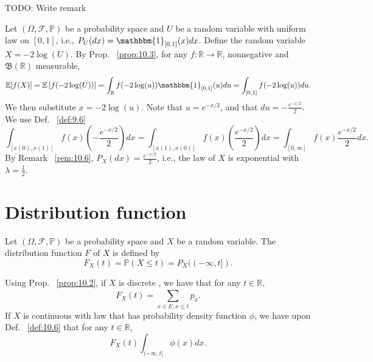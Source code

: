 \begin{remark}[]
    \label{rem:10.6}
    TODO: Write remark
\end{remark}

\begin{example}[]
    \label{ex:10.20}
    Let $(\Omega, \mathcal{F}, \mathbb{P})$ be a probability space and $U $ be a random variable with
    uniform law on $\left[ 0,1 \right]  $, i.e., $P_U(dx) = \mathbbm{1}_{\left[ 0,1 \right] }(x) dx $. 
    Define the random variable $X = -2\log(U) $. By Prop. ~\ref{prop:10.3}, for any $f: \mathbb{R} \to \mathbb{R} $,
    nonnegative and $\mathfrak{B}(\mathbb{R}) $ measurable,
    \[
      \mathbb{E}[f(X)] = \mathbb{E}\left[ f(-2\log(U)) \right] 
      = \int_{\mathbb{R}} f(-2\log(u))\mathbbm{1}_{\left[ 0,1 \right] }(u) du 
      = \int_{\left[ 0,1 \right] } f(-2\log(u))du
    .\] 
    We then substitute $x = -2\log(u)$. Note that $u = e^{-x / 2} $, and that
    $du = - \frac{e^{-x/2}}{2} $. We use Def. ~\ref{def:9.6}
    \[
    \int_{\left[ x(0), x(1) \right] } f(x)\left(-\frac{e^{-x / 2}}{2} \right) dx
    = \int_{\left[ x(1), x(0) \right] } f(x)\left(\frac{e^{-x / 2}}{2} \right) dx
    = \int_{\left[ 0, \infty \right] } f(x) \frac{e^{-x / 2}}{2} dx
    .\] 
    By Remark ~\ref{rem:10.6}, $P_X(dx) = \frac{e^{-x /2}}{2} $, i.e., the law of $X $
    is exponential with  $\lambda = \frac{1}{2} $.
\end{example}

\section{Distribution function}%
\label{sec:Distribution function}

\begin{definition}[]
    \label{def:10.10}
    Let $(\Omega, \mathcal{F}, \mathbb{P})$ be a probability space and $X$ be a random variable. The distribution
    function $F$ of $X$ is defined by
    \[
        F_X(t) = \mathbb{P}(X \le t) = P_X((-\infty, t])
    .\] 
    
    \begin{remark}[]
        \label{rem:10.7}
        Using Prop. ~\ref{prop:10.2}, if $X$ is discrete , we have that for any $t \in \mathbb{R}$,
        \[
        F_X(t)=\sum_{x\in E, x\le t}^{ } p_x
        .\] 
        If $X$ is continuous with law that has probability density function $\phi$, we have upon Def.
        ~\ref{def:10.6} that for any $t \in \mathbb{R}$,
        \[
            F_X(t) \int_{(-\infty, t]} \phi(x)dx
        .\] 
    \end{remark}
\end{definition}




